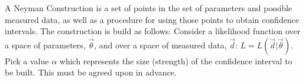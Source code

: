 
A Neyman Construction is a set of points in the set of parameters and possible measured data, as well as a procedure for using those points to obtain confidence intervals.
The construction is build as follows:
Consider a likelihood function over a space of parameters, $\vec{\theta}$, and over a space of measured data, $\vec{d}$: $L = L(\vec{d} | \vec{\theta} )$.
Pick a value $\alpha$ which represents the size (strength) of the confidence interval to be built.  This must be agreed upon in advance.
